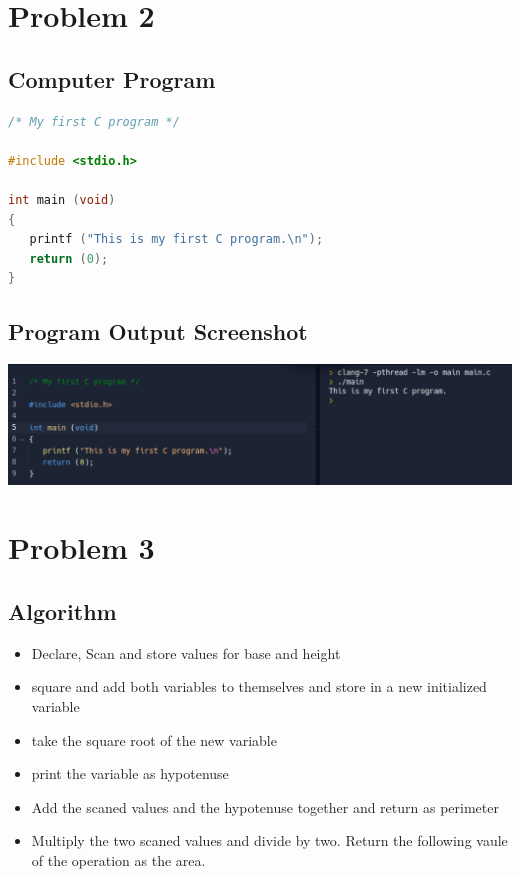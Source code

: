 \section{{Problem 2}}

	\subsection{{Computer Program}}

		\begin{lstlisting}[language=C, caption=\textit{Hello World Program}]	
/* My first C program */

#include <stdio.h>

int main (void)
{
   printf ("This is my first C program.\n");
   return (0);
}


\end{lstlisting}

	\subsection{{Program Output Screenshot}}

		\includegraphics[width=15cm]{Hello World.png}
		
\section{{Problem 3}}

		\subsection{{Algorithm}}	
	
		\begin{itemize}
			\item {Declare, Scan and store values for base and height}
			\item {square and add both variables to themselves and store in a new initialized variable}
			\item {take the square root of the new variable}
			\item {print the variable as hypotenuse}
			\item {Add the scaned values and the hypotenuse together and return as perimeter}
			\item {Multiply the two scaned values and divide by two. Return the following vaule of the operation as the area.}
		\end{itemize}
	
